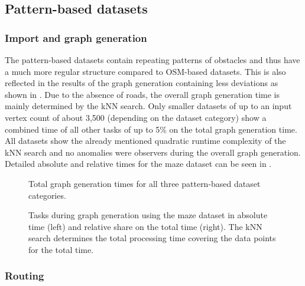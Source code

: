 	\subsection{Pattern-based datasets}
	
		\subsubsection{Import and graph generation}
		
			The pattern-based datasets contain repeating patterns of obstacles and thus have a much more regular structure compared to OSM-based datasets.
			This is also reflected in the results of the graph generation containing less deviations as shown in .
			Due to the absence of roads, the overall graph generation time is mainly determined by the kNN search.
			Only smaller datasets of up to an input vertex count of about 3,500 (depending on the dataset category) show a combined time of all other tasks of up to 5\% on the total graph generation time.
			All datasets show the already mentioned quadratic runtime complexity of the kNN search and no anomalies were observers during the overall graph generation.
			Detailed absolute and relative times for the maze dataset can be seen in .
			
			\begin{figure}[h]
				\begin{figcenter}
					
				\end{figcenter}
				\caption{Total graph generation times for all three pattern-based dataset categories.}
				\label{fig:eval-import-pattern-abs}
			\end{figure}
			
			\begin{figure}[h]
				\begin{figcenter}
					
				\end{figcenter}
				\caption{Tasks during graph generation using the maze dataset in absolute time (left) and relative share on the total time (right). The kNN search determines the total processing time covering the data points for the total time.}
				\label{fig:eval-import-pattern-maze-abs-rel}
			\end{figure}
		
		\subsubsection{Routing}
		
